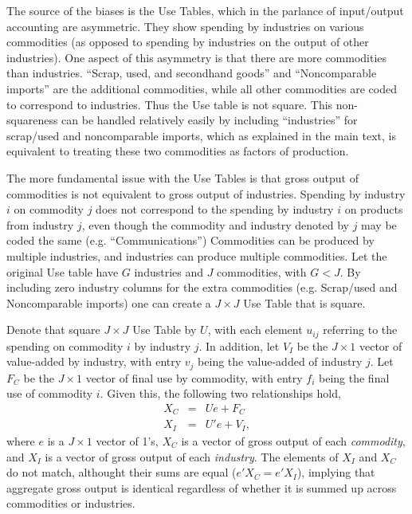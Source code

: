 The source of the biases is the Use Tables, which in the parlance of input/output accounting are asymmetric. They show spending by industries on various commodities (as opposed to spending by industries on the output of other industries). One aspect of this asymmetry is that there are more commodities than industries. ``Scrap, used, and secondhand goods'' and ``Noncomparable imports'' are the additional commodities, while all other commodities are coded to correspond to industries. Thus the Use table is not square. This non-squareness can be handled relatively easily by including ``industries'' for scrap/used and noncomparable imports, which as explained in the main text, is equivalent to treating these two commodities as factors of production.

The more fundamental issue with the Use Tables is that gross output of commodities is not equivalent to gross output of industries. Spending by industry $i$ on commodity $j$ does not correspond to the spending by industry $i$ on products from industry $j$, even though the commodity and industry denoted by $j$ may be coded the same (e.g. ``Communications'') Commodities can be produced by multiple industries, and industries can produce multiple commodities. Let the original Use table have $G$ industries and $J$ commodities, with $G<J$. By including zero industry columns for the extra commodities (e.g. Scrap/used and Noncomparable imports) one can create a $J \times J$ Use Table that is square. 

Denote that square $J \times J$ Use Table by $U$, with each element $u_{ij}$ referring to the spending on commodity $i$ by industry $j$. In addition, let $V_I$ be the $J \times 1$ vector of value-added by industry, with entry $v_j$ being the value-added of industry $j$. Let $F_C$ be the $J \times 1$ vector of final use by commodity, with entry $f_i$ being the final use of commodity $i$. Given this, the following two relationships hold,
\begin{eqnarray*}
	X_C &=& Ue + F_C \\
	X_I &=& U'e + V_I,
\end{eqnarray*}
where $e$ is a $J \times 1$ vector of 1's, $X_C$ is a vector of gross output of each \textit{commodity}, and $X_I$ is a vector of gross output of each \textit{industry}. The elements of $X_I$ and $X_C$ do not match, althought their sums are equal ($e'X_C = e'X_I$), implying that aggregate gross output is identical regardless of whether it is summed up across commodities or industries.

